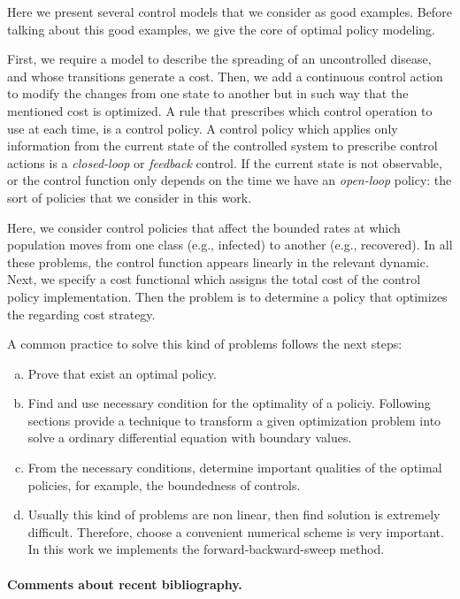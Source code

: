   Here we present  several control models that we consider as good 
examples. Before talking about this good examples, we give the core of optimal 
policy modeling.

  First, we require a model to describe the spreading of an uncontrolled
disease, and whose transitions generate a cost. Then, we add a continuous
control action to modify the changes from one state to another but in such way
that the mentioned cost is optimized. A rule that prescribes which control
operation to use at each time, is a control policy. A control policy which
applies only information from the current state of the controlled system to
prescribe control actions is a \emph{closed-loop} or \emph{feedback} control.
If the current state is not observable, or the control function only depends 
on the time we have an \emph{open-loop} policy: the sort of policies that we 
consider in this work.

  Here, we consider control policies that affect the bounded rates at which
population moves from one class (e.g., infected) to another (e.g., recovered).
In all these problems, the control function appears linearly in the relevant
dynamic. Next, we specify a cost functional which assigns the total cost of the
control policy implementation. Then the problem is to determine a policy that
optimizes the regarding cost strategy.

  A common practice to solve this kind of problems follows the next steps:
  \begin{enumerate}[(a)]
    \item
      Prove that exist an optimal policy.
    \item 
      Find and use necessary condition for the optimality of a policiy.
      Following sections provide a technique to transform a given optimization
      problem into solve a ordinary differential equation with boundary values.
    \item 
      From the necessary conditions, determine important qualities of the 
      optimal policies, for example, the boundedness of controls.
    \item 
      Usually this kind of problems are non linear, then find solution is 
      extremely difficult. Therefore, choose a convenient numerical scheme is
      very important. In this work we implements the forward-backward-sweep 
      method.
  \end{enumerate}
\paragraph{Comments about recent bibliography.}
